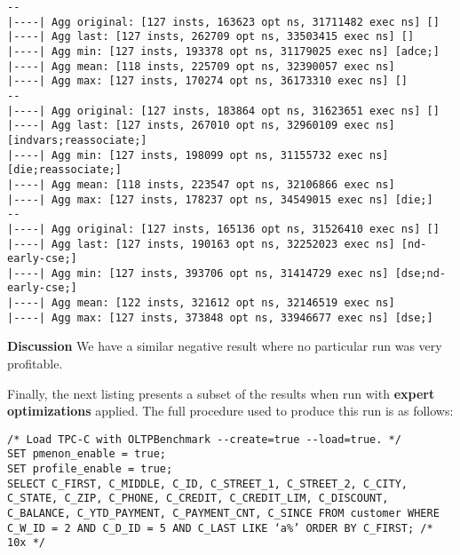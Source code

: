 \documentclass{vldb}
\begin{document}
\begin{lstlisting}
--
|----| Agg original: [127 insts, 163623 opt ns, 31711482 exec ns] []
|----| Agg last: [127 insts, 262709 opt ns, 33503415 exec ns] []
|----| Agg min: [127 insts, 193378 opt ns, 31179025 exec ns] [adce;]
|----| Agg mean: [118 insts, 225709 opt ns, 32390057 exec ns]
|----| Agg max: [127 insts, 170274 opt ns, 36173310 exec ns] []
--
|----| Agg original: [127 insts, 183864 opt ns, 31623651 exec ns] []
|----| Agg last: [127 insts, 267010 opt ns, 32960109 exec ns] [indvars;reassociate;]
|----| Agg min: [127 insts, 198099 opt ns, 31155732 exec ns] [die;reassociate;]
|----| Agg mean: [118 insts, 223547 opt ns, 32106866 exec ns]
|----| Agg max: [127 insts, 178237 opt ns, 34549015 exec ns] [die;]
--
|----| Agg original: [127 insts, 165136 opt ns, 31526410 exec ns] []
|----| Agg last: [127 insts, 190163 opt ns, 32252023 exec ns] [nd-early-cse;]
|----| Agg min: [127 insts, 393706 opt ns, 31414729 exec ns] [dse;nd-early-cse;]
|----| Agg mean: [122 insts, 321612 opt ns, 32146519 exec ns]
|----| Agg max: [127 insts, 373848 opt ns, 33946677 exec ns] [dse;]
\end{lstlisting}

\textbf{Discussion} We have a similar negative result where no particular run was very profitable.

Finally, the next listing presents a subset of the results when run with \textbf{expert optimizations} applied. The full procedure used to produce this run is as follows:
\begin{lstlisting}
/* Load TPC-C with OLTPBenchmark --create=true --load=true. */
SET pmenon_enable = true;
SET profile_enable = true;
SELECT C_FIRST, C_MIDDLE, C_ID, C_STREET_1, C_STREET_2, C_CITY, C_STATE, C_ZIP, C_PHONE, C_CREDIT, C_CREDIT_LIM, C_DISCOUNT, C_BALANCE, C_YTD_PAYMENT, C_PAYMENT_CNT, C_SINCE FROM customer WHERE C_W_ID = 2 AND C_D_ID = 5 AND C_LAST LIKE ‘a%’ ORDER BY C_FIRST; /* 10x */
\end{lstlisting}
\end{document}

